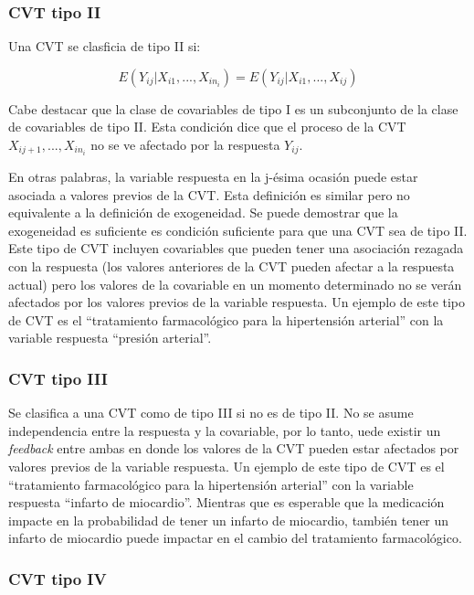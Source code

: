 \documentclass[spanish]{article}
\numberwithin{figure}{subsection}
\numberwithin{equation}{subsection}
\numberwithin{table}{subsection}
\begin{document}
\subsubsection{CVT tipo II}

Una CVT se clasficia de tipo II si:

\begin{equation}
	\label{CVT tipo II}
	E(Y_{ij}|X_{i1}, ..., X_{in_i}) = E(Y_{ij}|X_{i1}, ..., X_{ij})
\end{equation}

Cabe destacar que la clase de covariables de tipo I es un subconjunto de la
clase de covariables de tipo II. Esta condición dice que el proceso de la CVT
$X_{ij+1}, ..., X_{in_i}$ no se ve afectado por la respuesta $Y_{ij}$.

En otras palabras, la variable respuesta en la j-ésima ocasión puede estar
asociada a valores previos de la CVT. Esta definición es similar pero no
equivalente a la definición de exogeneidad. Se puede demostrar que la
exogeneidad es suficiente es condición suficiente para que una CVT sea de tipo
II. Este tipo de CVT incluyen covariables que pueden tener una asociación
rezagada con la respuesta (los valores anteriores de la CVT pueden afectar a la
respuesta actual) pero los valores de la covariable en un momento determinado
no se verán afectados por los valores previos de la variable respuesta. Un
ejemplo de este tipo de CVT es el ``tratamiento farmacológico para la
hipertensión arterial'' con la variable respuesta ``presión arterial''.

\subsubsection{CVT tipo III}

Se clasifica a una CVT como de tipo III si no es de tipo II. No se asume
independencia entre la respuesta y la covariable, por lo tanto, uede existir un
\textit{feedback} entre ambas en donde los valores de la CVT pueden estar
afectados por valores previos de la variable respuesta. Un ejemplo de este tipo
de CVT es el ``tratamiento farmacológico para la hipertensión arterial'' con la
variable respuesta ``infarto de miocardio''. Mientras que es esperable que la
medicación impacte en la probabilidad de tener un infarto de miocardio, también
tener un infarto de miocardio puede impactar en el cambio del tratamiento
farmacológico.

\subsubsection{CVT tipo IV}
\end{document}
